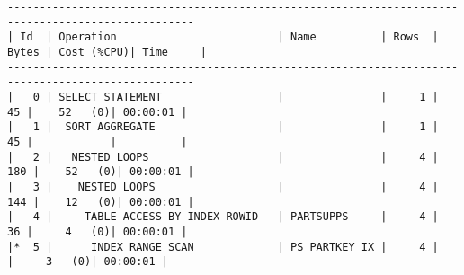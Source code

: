 \documentclass[11pt,a4paper,parskip=half]{scrartcl}
\begin{document}
\begin{lstlisting}
---------------------------------------------------------------------------------------------------                                                                                                                                                                                                          
| Id  | Operation                         | Name          | Rows  | Bytes | Cost (%CPU)| Time     |                                                                                                                                                                                                          
---------------------------------------------------------------------------------------------------                                                                                                                                                                                                          
|   0 | SELECT STATEMENT                  |               |     1 |    45 |    52   (0)| 00:00:01 |                                                                                                                                                                                                          
|   1 |  SORT AGGREGATE                   |               |     1 |    45 |            |          |                                                                                                                                                                                                          
|   2 |   NESTED LOOPS                    |               |     4 |   180 |    52   (0)| 00:00:01 |                                                                                                                                                                                                          
|   3 |    NESTED LOOPS                   |               |     4 |   144 |    12   (0)| 00:00:01 |                                                                                                                                                                                                          
|   4 |     TABLE ACCESS BY INDEX ROWID   | PARTSUPPS     |     4 |    36 |     4   (0)| 00:00:01 |                                                                                                                                                                                                          
|*  5 |      INDEX RANGE SCAN             | PS_PARTKEY_IX |     4 |       |     3   (0)| 00:00:01 |                                                                                                                                                                                                          

\end{lstlisting}
\end{document}
